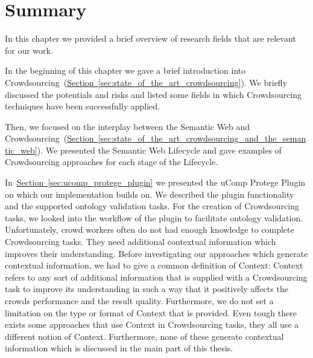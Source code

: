 \section{Summary}\label{sec:state_of_the_art_summary}
In this chapter we provided a brief overview of research fields that are relevant for our work.

In the beginning of this chapter we gave a brief introduction into Crowdsourcing~(\hyperref[sec:state_of_the_art_crowdsourcing]{Section~\ref*{sec:state_of_the_art_crowdsourcing}}). We briefly discussed the potentials and risks and listed some fields in which Crowdsourcing techniques have been successfully applied. 

Then, we focused on the interplay between the Semantic Web and Crowdsourcing~(\hyperref[sec:state_of_the_art_crowdsourcing_and_the_semantic_web]{Section~\ref*{sec:state_of_the_art_crowdsourcing_and_the_semantic_web}}). We presented the Semantic Web Lifecycle and gave examples of Crowdsourcing approaches for each stage of the Lifecycle. 

In~\hyperref[sec:ucomp_protege_plugin]{Section~\ref*{sec:ucomp_protege_plugin}} we presented the uComp Protege Plugin on which our implementation builds on. We described the plugin functionality and the supported ontology validation tasks. For the creation of Crowdsourcing tasks, we looked into the workflow of the plugin to facilitate ontology validation. 
Unfortunately, crowd workers often do not had enough knowledge to complete Crowdsourcing tasks. They need additional contextual information which improves their understanding. Before investigating our approaches which generate contextual information, we had to give a common definition of \guillemotright Context\guillemotleft:
Context refers to any sort of additional information that is supplied with a Crowdsourcing task to improve its understanding in
such a way that it positively affects the crowds performance and the result quality. Furthermore, we do not set a limitation on the type or format of Context that is provided. Even tough there exists some approaches that use Context in Crowdsourcing tasks,
they all use a different notion of Context. Furthermore, none of these generate contextual information which is discussed in the main part of this thesis. 

